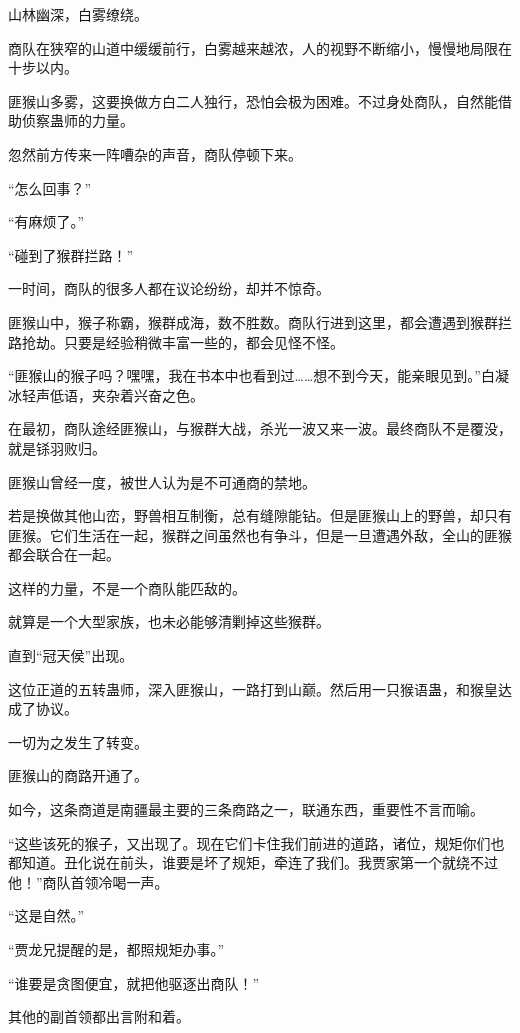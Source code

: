 \begin{this_body}
山林幽深，白雾缭绕。

商队在狭窄的山道中缓缓前行，白雾越来越浓，人的视野不断缩小，慢慢地局限在十步以内。

匪猴山多雾，这要换做方白二人独行，恐怕会极为困难。不过身处商队，自然能借助侦察蛊师的力量。

忽然前方传来一阵嘈杂的声音，商队停顿下来。

“怎么回事？”

“有麻烦了。”

“碰到了猴群拦路！”

一时间，商队的很多人都在议论纷纷，却并不惊奇。

匪猴山中，猴子称霸，猴群成海，数不胜数。商队行进到这里，都会遭遇到猴群拦路抢劫。只要是经验稍微丰富一些的，都会见怪不怪。

“匪猴山的猴子吗？嘿嘿，我在书本中也看到过……想不到今天，能亲眼见到。”白凝冰轻声低语，夹杂着兴奋之色。

在最初，商队途经匪猴山，与猴群大战，杀光一波又来一波。最终商队不是覆没，就是铩羽败归。

匪猴山曾经一度，被世人认为是不可通商的禁地。

若是换做其他山峦，野兽相互制衡，总有缝隙能钻。但是匪猴山上的野兽，却只有匪猴。它们生活在一起，猴群之间虽然也有争斗，但是一旦遭遇外敌，全山的匪猴都会联合在一起。

这样的力量，不是一个商队能匹敌的。

就算是一个大型家族，也未必能够清剿掉这些猴群。

直到“冠天侯”出现。

这位正道的五转蛊师，深入匪猴山，一路打到山巅。然后用一只猴语蛊，和猴皇达成了协议。

一切为之发生了转变。

匪猴山的商路开通了。

如今，这条商道是南疆最主要的三条商路之一，联通东西，重要性不言而喻。

“这些该死的猴子，又出现了。现在它们卡住我们前进的道路，诸位，规矩你们也都知道。丑化说在前头，谁要是坏了规矩，牵连了我们。我贾家第一个就绕不过他！”商队首领冷喝一声。

“这是自然。”

“贾龙兄提醒的是，都照规矩办事。”

“谁要是贪图便宜，就把他驱逐出商队！”

其他的副首领都出言附和着。

\end{this_body}

